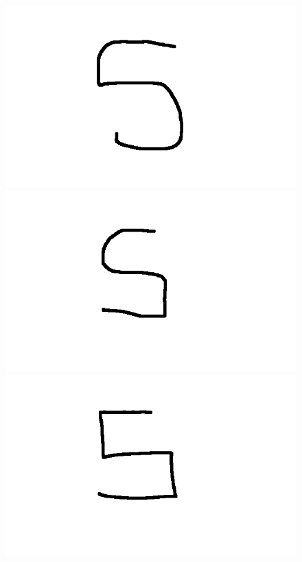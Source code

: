\documentclass[a4paper,12px,twocolumn]{article}
\begin{document}
\begin{flushleft}
    \bigskip
\begin{figure}[h!]
        \includegraphics[scale=0.1]{tS11}
        \includegraphics[scale=0.1]{tS12}
        \includegraphics[scale=0.1]{tS13}

\end{figure}
\end{flushleft}
\end{document}

